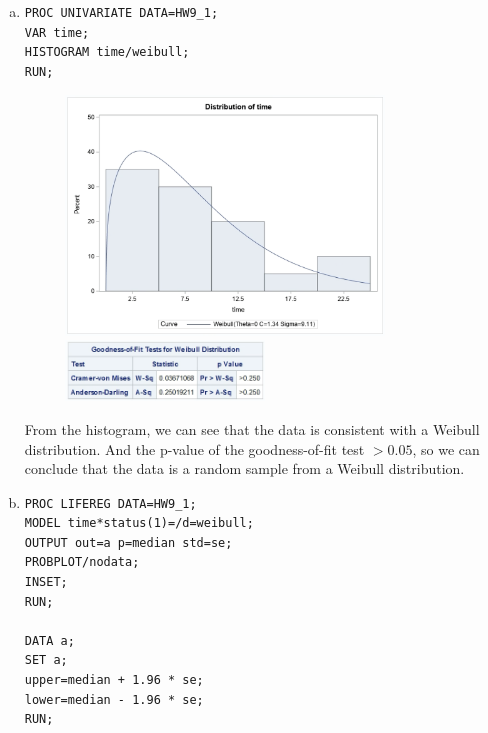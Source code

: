 \documentclass{elegantbook}
\begin{document}
\begin{solution}
    \begin{enumerate}[(a)]
        \item \begin{verbatim}
PROC UNIVARIATE DATA=HW9_1;
VAR time;
HISTOGRAM time/weibull;
RUN;
        \end{verbatim}
        \begin{figure}[H]
            \centering
            \includegraphics[width=0.8\textwidth]{HW9_2a.png}
            \includegraphics[width=0.5\textwidth]{HW9_2a1.png}
        \end{figure}
        From the histogram, we can see that the data is consistent with a Weibull distribution. And the p-value of the goodness-of-fit test $>0.05$, so we can conclude that the data is a random sample from a Weibull distribution. 
        \item \begin{verbatim}
PROC LIFEREG DATA=HW9_1;
MODEL time*status(1)=/d=weibull;
OUTPUT out=a p=median std=se;
PROBPLOT/nodata;
INSET;
RUN;

DATA a;
SET a;
upper=median + 1.96 * se;
lower=median - 1.96 * se;
RUN;


\end{verbatim}
\end{enumerate}
\end{solution}
\end{document}
